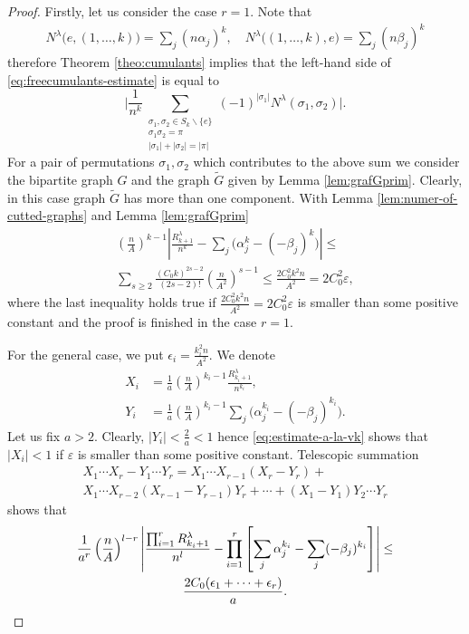 \documentclass[12pt]{amsart}
\theoremstyle{plain}
\theoremstyle{remark}
\begin{document}
\begin{proof}
Firstly, let us consider the case $r=1$. Note that
\begin{align*}
N^\lambda\big(e,(1,\ldots,k)\big) =\sum_j (n \alpha_j)^k,\quad
N^\lambda\big((1,\ldots,k),e\big) =\sum_j (n \beta_j)^k
\end{align*}
therefore Theorem \ref{theo:cumulants} implies that the left-hand side of
\eqref{eq:freecumulants-estimate} is equal to
$$\Bigg|\frac{1}{n^k} \sum_{\substack{\sigma_1,\sigma_2 \in S_k \backslash \{e\}
\\ \sigma_1 \sigma_2 = \pi \\ |\sigma_1| + |\sigma_2| = |\pi|}}
(-1)^{|\sigma_1|} N^\lambda(\sigma_1,\sigma_2)\Bigg|.$$
For a pair of permutations $\sigma_1,\sigma_2$ which contributes to the above
sum  we consider the bipartite graph $G$ and the graph $\tilde{G}$
given by Lemma \ref{lem:grafGprim}. Clearly, in this case graph $\tilde{G}$ 
has more than one component. 
With Lemma \ref{lem:numer-of-cutted-graphs} and Lemma \ref{lem:grafGprim}
\begin{multline}
\label{eq:estimate-a-la-vk}
\left(\frac{n}{A}\right)^{k-1} \left|
\frac{R^\lambda_{k+1}}{n^k} - \sum_j \big( \alpha_j^{k} - 
(-\beta_{j})^{k} \big) \right|
\leq \\ \sum_{s \geq 2} \frac{(C_0 k)^{2s-2}}{(2s-2)!}
\left(\frac{n}{A^2}\right)^{s-1} \leq
 \frac{2 C_0^2 k^2 n}{A^2}= 2 C_0^2 \varepsilon,
\end{multline}
where the last inequality holds true if $\frac{2 C_0^2 k^2 n}{A^2}=2 C_0^2
\varepsilon$ is smaller than some positive constant
and the proof is finished in
the case $r=1$.


For the general case, we put $\epsilon_i = \frac{k_i^2
n}{A^2}$. We denote 
\begin{align*}
 X_i&=\frac{1}{a} \left(\frac{n}{A}\right)^{k_i-1}
\frac{R^\lambda_{{k_i}+1}}{n^{k_i}},\\
 Y_i&=\frac{1}{a} \left(\frac{n}{A}\right)^{k_i-1} \sum_j \big( \alpha_j^{k_i} -
(-\beta_{j})^{k_i} \big).
\end{align*}
Let us fix $a>2$. Clearly, $|Y_i|< \frac{2}{a}< 1 $ hence
\eqref{eq:estimate-a-la-vk} shows that $|X_i|<1$ if $\varepsilon$ is smaller
than some positive constant. Telescopic summation
\begin{multline*}
X_1 \cdots X_r - Y_1 \cdots Y_r= X_1 \cdots X_{r-1} (X_r-Y_r)+\\
 X_1 \cdots X_{r-2} (X_{r-1}-Y_{r-1}) Y_r + \cdots 
+(X_1-Y_1) Y_2 \cdots Y_r
\end{multline*}
shows that
\begin{multline*} \frac{1}{a^r} \left(\frac{n}{A}\right)^{l-r}
\left| \frac{\prod_{i=1}^r R^\lambda_{k_i+1}}{n^l} - \prod_{i=1}^r \left[ \sum_j
\alpha_j^{k_i} - \sum_j (-\beta_{j})^{k_i} \right] \right| \leq \\
\frac{2 C_0 (\epsilon_1+\cdots+\epsilon_r)}{a}.\qedhere
\end{multline*}




\end{proof}
\end{document}
